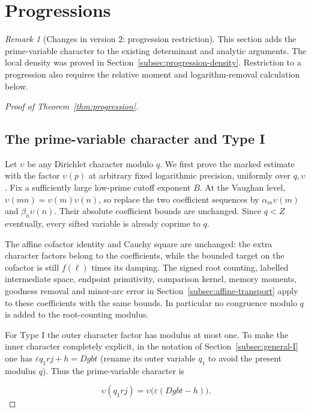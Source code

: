 \documentclass[11pt]{article}
\theoremstyle{definition}
\theoremstyle{remark}
\newtheorem{remark}[theorem]{Remark}
\numberwithin{equation}{section}
\begin{document}
\section{Progressions}\label{sec:progressions}
\begin{remark}[Changes in version 2: progression restriction]
This section adds the prime-variable character to the existing
determinant and analytic arguments. The local density was proved
in Section~\ref{subsec:progression-density}. Restriction to a
progression also requires the relative moment and logarithm-removal
calculation below.
\end{remark}
\begin{proof}[Proof of Theorem~\ref{thm:progression}]
\subsection*{The prime-variable character and Type I}
Let $\upsilon$ be any Dirichlet character modulo $q$. We first prove the marked estimate with the factor $\upsilon(p)$ at arbitrary fixed logarithmic precision, uniformly over $q,\upsilon$. Fix a sufficiently large low-prime cutoff exponent $B$. At the Vaughan level, $\upsilon(mn)=\upsilon(m)\upsilon(n)$, so replace the two coefficient sequences by $\alpha_m\upsilon(m)$ and $\beta_n\upsilon(n)$. Their absolute coefficient bounds are unchanged. Since $q<Z$ eventually, every sifted variable is already coprime to $q$.

The affine cofactor identity and Cauchy square are unchanged: the extra character factors belong to the coefficients, while the bounded target on the cofactor is still $f(\ell)$ times its damping. The signed root counting, labelled intermediate space, endpoint primitivity, comparison kernel, memory moments, goodness removal and minor-arc error in Section~\ref{subsec:affine-transport} apply to these coefficients with the same bounds. In particular no congruence modulo $q$ is added to the root-counting modulus.

For Type I the outer character factor has modulus at most one. To make the inner character completely explicit, in the notation of Section~\ref{subsec:general-I} one has $\varepsilon q_1rj+h=Dgbt$ (rename its outer variable $q_1$ to avoid the present modulus $q$). Thus the prime-variable character is


\begin{equation}
\upsilon(q_1rj)=\upsilon\big(\varepsilon(Dgbt-h)\big).
\end{equation}



\end{proof}
\end{document}
